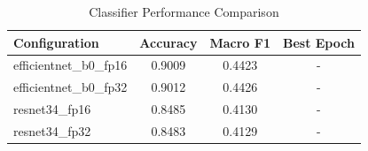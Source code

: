 \begin{table}[htbp]
\centering
\caption{Classifier Performance Comparison}
\label{tab:classifier_results}
\begin{tabular}{lccc}
\hline
Configuration & Accuracy & Macro F1 & Best Epoch \\
\hline
efficientnet_b0_fp16 & 0.9009 & 0.4423 & - \\
efficientnet_b0_fp32 & 0.9012 & 0.4426 & - \\
resnet34_fp16 & 0.8485 & 0.4130 & - \\
resnet34_fp32 & 0.8483 & 0.4129 & - \\
\hline
\end{tabular}
\end{table}